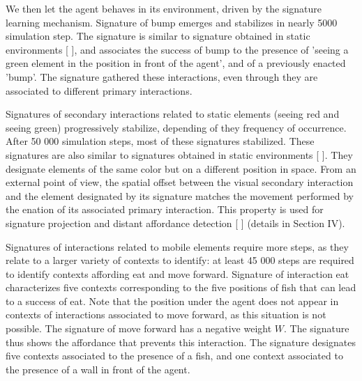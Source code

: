 \documentclass[conference]{IEEEtran}
\begin{document}





We then let the agent behaves in its environment, driven by the signature learning mechanism. Signature of bump emerges and stabilizes in nearly 5000 simulation step. The signature is similar to signature obtained in static environments [ ], and associates the success of bump to the presence of 'seeing a green element in the position in front of the agent', and of a previously enacted 'bump'. The signature gathered these interactions, even through they are associated to different primary interactions. %

Signatures of secondary interactions related to static elements (seeing red and seeing green) progressively stabilize, depending of they frequency of occurrence. After 50 000 simulation steps, most of these signatures stabilized. These signatures are also similar to signatures obtained in static environments [ ]. They designate elements of the same color but on a different position in space. From an external point of view, the spatial offset between the visual secondary interaction and the element designated by its signature matches the movement performed by the enation of its associated primary interaction. This property is used for signature projection and distant affordance detection [ ] (details in Section IV).

Signatures of interactions related to mobile elements require more steps, as they relate to a larger variety of contexts to identify: at least 45 000 steps are required to identify contexts affording eat and move forward. Signature of interaction eat characterizes five contexts corresponding to the five positions of fish that can lead to a success of eat. Note that the position under the agent does not appear in contexts of interactions associated to move forward, as this situation is not possible. The signature of move forward has a negative weight $W$. The signature thus shows the affordance that prevents this interaction. The signature designates five contexts associated to the presence of a fish, and one context associated to the presence of a wall in front of the agent.
\end{document}
